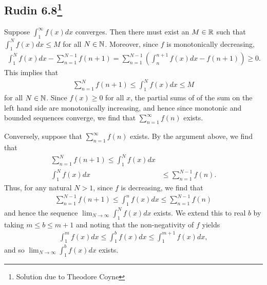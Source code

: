 \documentclass{../mathnotes}
\begin{document}
\subsection*{Rudin 6.8\footnote{Solution due to Theodore Coyne}}
Suppose $\int_1^\infty f(x)dx$ converges. Then there must exist an $M\in\mathbb{R}$ such
that $\int_1^Nf(x)dx\leq M$ for all $N\in\mathbb{N}$. Moreover, since $f$ is monotonically
decreasing,
\begin{align*}
    \int_1^N f(x) dx - \sum_{n=1}^{N-1}f(n+1)=\sum_{n=1}^{N-1}\left( \int_n^{n+1}f(x)dx-f(n+1) \right)\geq 0.
\end{align*}
This implies that
\begin{align*}
    \sum_{n=1}^Nf(n+1)\leq \int_1^Nf(x)dx\leq M
\end{align*}
for all $N\in\mathbb{N}$. Since $f(x)\geq 0$ for all $x$, the partial sums of of the sum on the
left hand side are monotonically increasing, and hence since monotonic and bounded
sequences converge, we find that $\sum_{n=1}^\infty f(n)$ exists.

Conversely, suppose that $\sum_{n=1}^\infty f(n)$ exists. By the argument above, we
find that
\begin{align*}
    \sum_{n=1}^Nf(n+1)\leq \int_1^Nf(x)dx&\\
    \int_1^Nf(x)dx&\leq \sum_{n=1}^{N-1} f(n).
\end{align*}
Thus, for any natural $N>1$, since $f$ is decreasing, we find that
\begin{align*}
    \sum_{n=1}^{N-1}f(n+1)\leq \int_1^n f(x)dx\leq \sum_{n=1}^{N-1}f(n)
\end{align*}
and hence the sequence $\lim_{N\to\infty}\int_1^N f(x)dx$ exists. We extend
this to real $b$ by taking $m\leq b\leq m+1$ and noting that the non-negativity
of $f$ yields
\begin{align*}
    \int_1^m f(x)dx\leq \int_1^b f(x)dx\leq \int_1^{m+1} f(x)dx,
\end{align*}
and so $\lim_{N\to\infty}\int_{1}^bf(x)dx$ exists.
\end{document}

